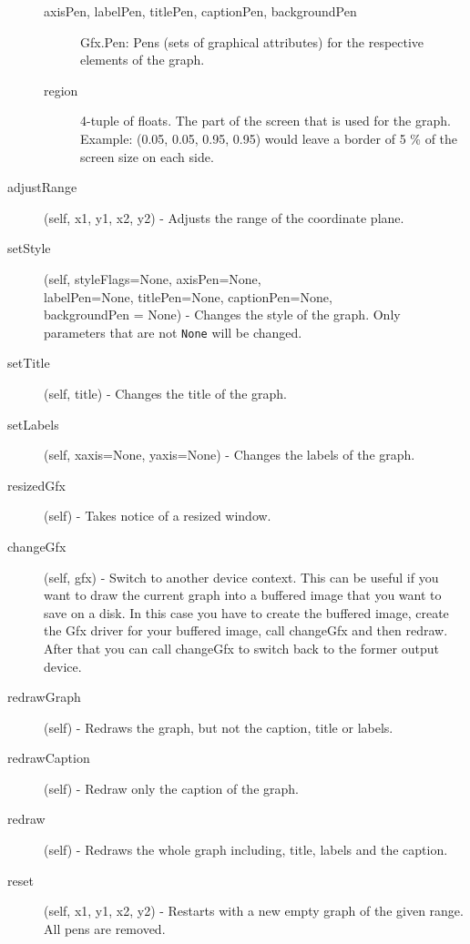 \documentclass[12pt,a4paper,USenglish]{article}
\begin{document}
\begin{description}
\begin{description}
\item[axisPen, labelPen, titlePen, captionPen, backgroundPen] Gfx.Pen: 
	Pens (sets of graphical attributes) for the respective elements 
        of the graph.
\item[region] 4-tuple of floats. The part of the screen that is used 
	for the graph. Example: (0.05, 0.05, 0.95, 0.95) would leave a 
	border of 5 \% of the screen size on each side.

\end{description}

\item[adjustRange](self, x1, y1, x2, y2) - Adjusts the range of the
  coordinate plane.

\item[setStyle](self, styleFlags=None, axisPen=None,\\ 
      labelPen=None, titlePen=None, captionPen=None,\\
      backgroundPen = None) - Changes the style of the graph. 
      Only parameters that are not {\tt None} will be changed.

\item[setTitle](self, title) - Changes the title of the graph.

\item[setLabels](self, xaxis=None, yaxis=None) - Changes the labels of
  the graph.

\item[resizedGfx](self) - Takes notice of a resized window.

\item[changeGfx](self, gfx) - Switch to another device context. This
  can be useful if you want to draw the current graph into a buffered
  image that you want to save on a disk. In this case you have to
  create the buffered image, create the Gfx driver for your buffered
  image, call changeGfx and then redraw. After that you can call
  changeGfx to switch back to the former output device.

\item[redrawGraph](self) - Redraws the graph, but not the caption,
  title or labels.

\item[redrawCaption](self) - Redraw only the caption of the graph.

\item[redraw](self) - Redraws the whole graph including, title, labels
  and the caption.

\item[reset](self, x1, y1, x2, y2) - Restarts with a new empty graph
  of the given range. All pens are removed.


\end{description}
\end{document}
